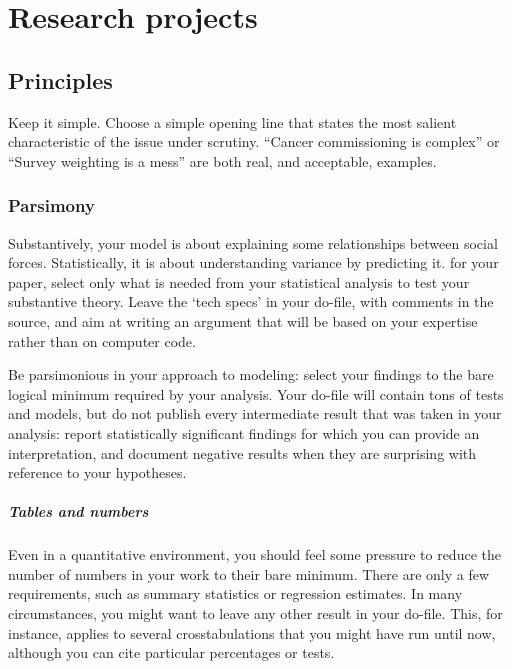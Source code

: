 %
%
\chapter{Research projects}%
  \label{ch:paper}%
  \startcontents[chapters]%
  \newpage

\section{Principles}

Keep it simple. Choose a simple opening line that states the most salient characteristic of the issue under scrutiny. ``Cancer commissioning is complex'' or ``Survey weighting is a mess'' are both real, and acceptable, examples.

\subsection{Parsimony}

Substantively, your model is about explaining some relationships between social forces. Statistically, it is about understanding variance by predicting it. for your paper, select only what is needed from your statistical analysis to test your substantive theory. Leave the `tech specs' in your do-file, with comments in the source, and aim at writing an argument that will be based on your expertise rather than on computer code.%

  Be parsimonious in your approach to modeling: select your findings to the bare logical minimum required by your analysis. Your do-file will contain tons of tests and models, but do not publish every intermediate result that was taken in your analysis: report statistically significant findings for which you can provide an interpretation, and document negative results when they are surprising with reference to your hypotheses.%

\paragraph{Tables and numbers} Even in a quantitative environment, you should feel some pressure to reduce the number of numbers in your work to their bare minimum. There are only a few requirements, such as summary statistics or regression estimates. In many circumstances, you might want to leave any other result in your do-file. This, for instance, applies to several crosstabulations that you might have run until now, although you can cite particular percentages or tests.%

